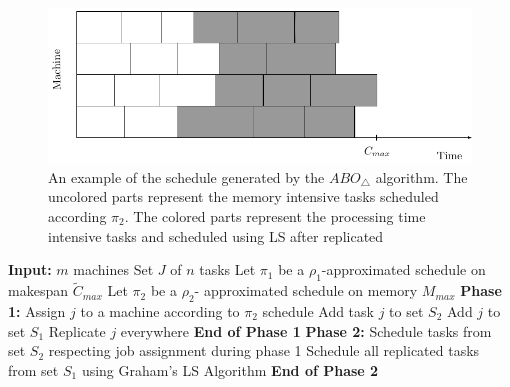 \documentclass[12pt]{article}
\theoremstyle{mystyle}
\begin{document}
      \begin{figure}[htp]
      \centering
      \includegraphics[width= 16 cm]{mem.pdf}
      \caption{An example of the schedule generated by the $ABO_\triangle$ algorithm. The uncolored parts represent the memory intensive tasks scheduled according $\pi_2$. The colored parts represent the processing time intensive tasks and scheduled using LS after replicated}
      \label{fig:ch5-2}
      \end{figure}
     \begin{algorithm}
     
     \caption{$ABO_\triangle$}
     \label{alg1}
      \begin{algorithmic} 
      \State \textbf{Input:} $m$ machines 
      \State \hspace*{42pt}Set $J$ of $n$ tasks
      \State\hspace*{42pt}Let $\pi_1$ be a $ \rho_1$-approximated schedule on makespan $\tilde{C}_{max}$ 
     \State \hspace*{42pt}Let $\pi_2$ be a $\rho_2$- approximated schedule on memory ${M_{max}}$
     \State
      \State \textbf{Phase 1:}
   \State Assign $j$ to a machine according to $\pi_2$ schedule
   \State Add task $j$ to set $S_2$   
   \EndIf 
   \EndFor
   \State Add $j$ to set $S_1$
   \State Replicate $j$ everywhere   
   \EndIf 
   \EndFor
    \State \textbf{End of Phase 1} 
    \State 
     \State \textbf{Phase 2:} 
     \State \hspace*{42pt}Schedule tasks from set $S_2$ respecting job assignment during phase 1
        \State \hspace*{42pt} Schedule all replicated tasks from set $S_1$ using Graham's LS Algorithm 
     \State \textbf{End of Phase 2} 
      
           \end{algorithmic}
           \end{algorithm}
         
\end{document}
